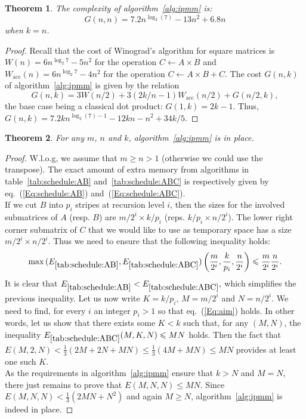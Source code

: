 \documentclass{article}
\renewcommand{\geq}{\geqslant}
\renewcommand{\leq}{\leqslant}
\newtheorem{thm}{Theorem}
\begin{document}
\begin{thm}
The complexity of algorithm~\ref{alg:ipmm} is:
$$G(n,n) = 7.2 n^{\log_2(7)}-13n^2+6.8n$$ when $k=n$.\end{thm}
\begin{proof}
Recall that  the cost of Winograd's algorithm for square matrices is $W(n) =
6n^{\log_2 7} - 5n^2$  for the operation $C\leftarrow A\times B$ and $W_\text{acc}(n) =
6n^{\log_2 7} - 4n^2$ for the operation $C\leftarrow A\times B + C$.
The cost $G(n,k)$ of algorithm~\ref{alg:ipmm} is given by the relation
$$G(n,k) = 3 W(n/2) +3(2k/n-1)W_\text{acc}(n/2)+G(n/2,k),$$ the base case
being a classical dot product: $G(1,k)=2k-1$.
Thus, $G(n,k) = 7.2 kn^{\log_2(7)-1}-12 kn-n^2+34 k / 5$.
\end{proof}
\begin{thm}
For any $m$, $n$ and $k$, algorithm~\ref{alg:ipmm} is in place.
\end{thm}
\begin{proof}
W.l.o.g, we assume that $m \geq n > 1$ (otherwise we could use the transpose).
	The exact amount of extra memory from algorithms in table~\ref{tab:schedule:AB} and~\ref{tab:schedule:ABC} is
	respectively given by eq.~(\ref{Eq:schedule:AB}) and~(\ref{Eq:schedule:ABC}).\\ 
If we cut $B$ into $p_i$ stripes at recursion level $i$, then the sizes for the involved submatrices of $A$ (resp. $B$) are $m/2^i \times k/p_i$ (reps. $k/p_i \times n/2^i$). 
	The lower right corner submatrix of $C$ that we would like to use as temporary space has a size $m/2^i \times n/2^i$.
	Thus we need to ensure that the following inequality holds:
	\begin{equation} \label{Eq:aim}
		\max{(E_{\ref{tab:schedule:AB}},E_{\ref{tab:schedule:ABC}})} \left( \frac{m}{2^i}, \frac{k}{p_i}, \frac{n}{2^i} \right) \leq \frac{m}{2^i}  \frac{n}{2^i}.
	\end{equation}
	It is clear that $E_{\ref{tab:schedule:AB}}<E_{\ref{tab:schedule:ABC}},$ which simplifies the previous inequality.
	Let us now write $K = k/p_i$, $M = m/2^i$ and $N = n/2^i$. We need to find, for every $i$ an integer $p_i>1$ so that eq.~(\ref{Eq:aim}) holds. In other words, let us show that there exists some $K<k$ such that, for any $(M,N)$, the inequality $E_{\ref{tab:schedule:ABC}}(M,K,N) \leq M N$ holds.
Then the fact that $E(M,2,N) < \frac{1}{3} (2M+2N+MN)
        \leq \frac{1}{3}(4M+MN) \leq MN$ provides at least one such $K$.\\
	As the requirements in algorithm~\ref{alg:ipmm} ensure that $k>N$ and $M=N$, there just remains to prove that $E(M,N,N) \leq MN$. Since $E(M,N,N)<\frac{1}{3}(2MN+N^2)$ and  again $M \geq N$, algorithm~\ref{alg:ipmm} is indeed in place.
\end{proof}
\end{document}
